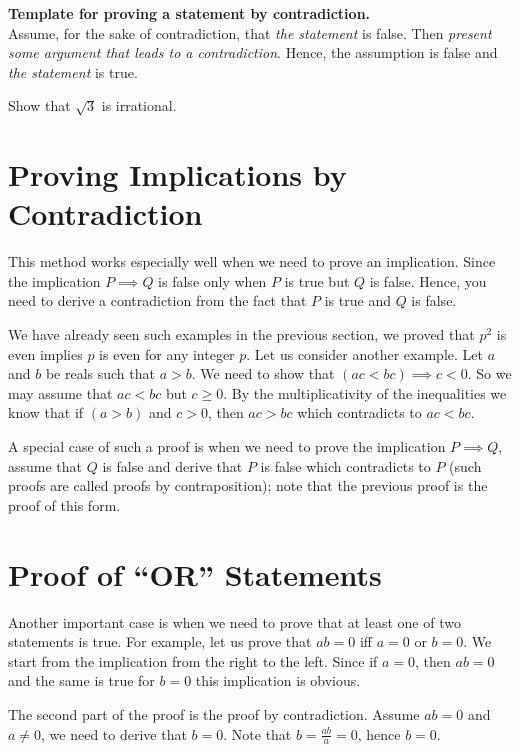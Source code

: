 \begin{template}
  \textbf{Template for proving a statement by contradiction.} \\

  Assume, for the sake of contradiction, that \textit{the statement} is false.
  Then \textit{present some argument that leads to a contradiction}. Hence, the
  assumption is false and \textit{the statement} is true.
\end{template}

\begin{exercise}
  Show that $\sqrt{3}$ is irrational.
\end{exercise}

\section{Proving Implications by Contradiction}
This method works especially well when we need to prove an implication.
Since the implication $P \implies Q$ is false only when $P$ is true but $Q$ is
false. Hence, you need to derive a contradiction from the fact that $P$ is true
and $Q$ is false.

We have already seen such examples in the previous section, we proved that
$p^2$ is even implies $p$ is even for any integer $p$. Let us consider another
example. Let $a$ and $b$ be reals such that $a > b$. We need to show that
$(ac < bc) \implies c < 0$. So we may assume that $ac < bc$ but $c \ge 0$. By
the multiplicativity of the inequalities we know that if $(a > b)$ and $c > 0$,
then $ac > bc$ which contradicts to $ac < bc$.

A special case of such a proof is when we need to prove the implication
$P \implies Q$, assume that $Q$ is false and derive that $P$ is false which
contradicts to  $P$ (such proofs are called proofs by contraposition); note
that the previous proof is the proof of this form.

\section{Proof of ``OR'' Statements}
Another important case is when we need to prove that at least one of two
statements is true. For example, let us prove that $ab = 0$ iff $a = 0$ or
$b = 0$. We start from the implication from the right to the left. Since if
$a = 0$, then $ab = 0$ and the same is true for $b = 0$ this implication is
obvious.

The second part of the proof is the proof by contradiction. Assume $ab = 0$ and
$a \neq 0$, we need to derive that $b = 0$. Note that $b = \frac{ab}{a} = 0$,
hence $b = 0$.

